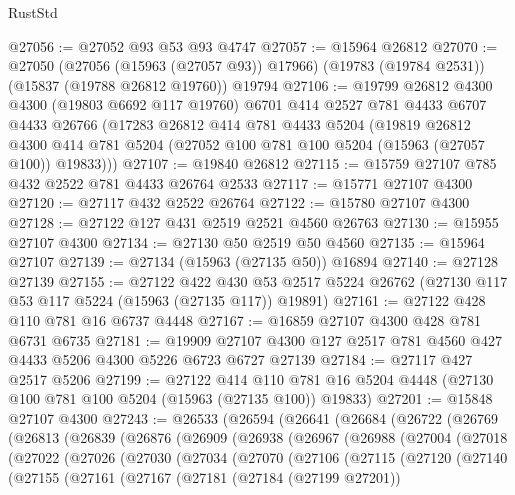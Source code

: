 \begin{lexlean}{RustStd}
\begin{coremodule}
@27056 := @27052 @93 @53 @93 @4747
@27057 := @15964 @26812
@27070 := @27050
    (@27056 (@15963 (@27057 @93)) @17966)
    (@19783 (@19784 @2531))
    (@15837 (@19788 @26812 @19760))
    @19794
@27106 := @19799
    @26812
    @4300
    @4300
    (@19803 @6692 @117 @19760)
    @6701
    @414
    @2527
    @781
    @4433
    @6707
    @4433
    @26766
    (@17283
      @26812
      @414
      @781
      @4433
      @5204
      (@19819
        @26812
        @4300
        @414
        @781
        @5204
        (@27052 @100 @781 @100 @5204 (@15963 (@27057 @100)) @19833)))
@27107 := @19840 @26812
@27115 := @15759 @27107 @785 @432 @2522 @781 @4433 @26764 @2533
@27117 := @15771 @27107 @4300
@27120 := @27117 @432 @2522 @26764
@27122 := @15780 @27107 @4300
@27128 := @27122 @127 @431 @2519 @2521 @4560 @26763
@27130 := @15955 @27107 @4300
@27134 := @27130 @50 @2519 @50 @4560
@27135 := @15964 @27107
@27139 := @27134 (@15963 (@27135 @50)) @16894
@27140 := @27128 @27139
@27155 := @27122
    @422
    @430
    @53
    @2517
    @5224
    @26762
    (@27130 @117 @53 @117 @5224 (@15963 (@27135 @117)) @19891)
@27161 := @27122 @428 @110 @781 @16 @6737 @4448
@27167 := @16859 @27107 @4300 @428 @781 @6731 @6735
@27181 := @19909 @27107 @4300 @127 @2517 @781 @4560 @427 @4433 @5206 @4300 @5226 @6723 @6727 @27139
@27184 := @27117 @427 @2517 @5206
@27199 := @27122
    @414
    @110
    @781
    @16
    @5204
    @4448
    (@27130 @100 @781 @100 @5204 (@15963 (@27135 @100)) @19833)
@27201 := @15848 @27107 @4300
@27243 := @26533
    (@26594
      (@26641
        (@26684
          (@26722
            (@26769
              (@26813
                (@26839
                  (@26876
                    (@26909
                      (@26938
                        (@26967
                          (@26988
                            (@27004
                              (@27018
                                (@27022
                                  (@27026
                                    (@27030
                                      (@27034
                                        (@27070
                                          (@27106
                                            (@27115
                                              (@27120
                                                (@27140
                                                  (@27155
                                                    (@27161
                                                      (@27167
                                                        (@27181
                                                          (@27184 (@27199 @27201))

\end{coremodule}
\end{lexlean}
